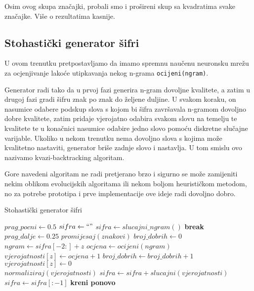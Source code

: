 \documentclass[a4paper,twocolumn,dvipdfm]{article}
\begin{document}
Osim ovog skupa zna\v{c}ajki, probali smo i pro\v{s}ireni skup sa kvadratima
svake zna\v{c}ajke. Vi\v{s}e o rezultatima kasnije.

\subsection{Stohasti\v{c}ki generator \v{s}ifri}

U ovom trenutku pretpostavljamo da imamo spremnu nau\v{c}enu neuronsku
mre\v{z}u za ocjenjivanje lako\'ce utipkavanja nekog n-grama
\texttt{ocijeni(ngram)}. 

Generator radi tako da u prvoj fazi generira n-gram dovoljne kvalitete, a zatim
u drugoj fazi gradi \v{s}ifru znak po znak do \v{z}eljene duljine. U svakom
koraku, on nasumice odabere podskup slova s kojom bi \v{s}ifra zavr\v{s}avala
n-gramom dovoljno dobre kvalitete, zatim pridaje vjerojatno odabira svakom
slovu na temelju te kvalitete te u kona\v{c}nici nasumice odabire jedno slovo
pomo\'cu diskretne slu\v{c}ajne varijable. Ukoliko u nekom trenutku nema
dovoljno slova s kojima mo\v{z}e kvalitetno nastaviti, generator bri\v{s}e
zadnje slovo i nastavlja. U tom smislu ovo nazivamo kvazi-backtracking
algoritam.

Gore navedeni algoritam ne radi pretjerano brzo i sigurno se mo\v{z}e zamijeniti
nekim oblikom evolucijskih algoritama ili nekom boljom heuristi\v{c}kom metodom,
no za potrebe prototipa i prve implementacije ove ideje radi dovoljno dobro.

\clearpage
\begin{algorithm}
\caption{Stohasti\v{c}ki generator \v{s}ifri}
\label{alg1}
\begin{algorithmic}
    \State $prag\_pocni \leftarrow 0.5$
    \State $sifra \leftarrow ``"$
    \Loop
        \State $sifra \leftarrow slucajni\_ngram()$
        \State \textbf{break}
        \EndIf
    \EndLoop\\
    \State $prag\_dalje \leftarrow 0.25$
        \State $promijesaj(znakovi)$
        \State $broj\_dobrih \leftarrow 0$\\
            \State $ngram \leftarrow sifra[-2:] + z$
            \State $ocjena \leftarrow ocijeni(ngram)$\\
                \State $vjerojatnosti[z] \leftarrow ocjena + 1$
                \State $broj\_dobrih \leftarrow broj\_dobrih + 1$
            \Else
                \State $vjerojatnosti[z] \leftarrow 0$
            \EndIf
        \EndFor\\
        \State $normaliziraj(vjerojatnosti)$
            \State $sifra \leftarrow sifra + slucajni(vjerojatnosti)$
            \State $sifra \leftarrow sifra[:-1]$
        \Else
            \State \textbf{kreni ponovo}
        \EndIf
    \EndWhile
\end{algorithmic}
\end{algorithm}
\end{document}
